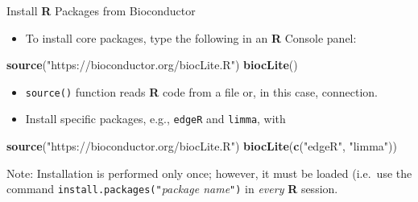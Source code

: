 \documentclass[ignorenonframetext,]{beamer}
\newenvironment{Shaded}{\begin{snugshade}}{\end{snugshade}}
\newcommand{\KeywordTok}[1]{\textcolor[rgb]{0.13,0.29,0.53}{\textbf{#1}}}
\newcommand{\StringTok}[1]{\textcolor[rgb]{0.31,0.60,0.02}{#1}}
\newcommand{\NormalTok}[1]{#1}
\providecommand{\tightlist}{%
  \setlength{\itemsep}{0pt}\setlength{\parskip}{0pt}}
\let\oldShaded\Shaded
\let\endoldShaded\endShaded
\renewenvironment{Shaded}{\footnotesize\oldShaded}{\endoldShaded}
\begin{document}
\begin{frame}[fragile]{Install \textbf{R} Packages from Bioconductor}

\begin{itemize}
\tightlist
\item
  To install core packages, type the following in an \textbf{R} Console
  panel:
\end{itemize}

\begin{Shaded}
\begin{Highlighting}[]
\KeywordTok{source}\NormalTok{(}\StringTok{"https://bioconductor.org/biocLite.R"}\NormalTok{)}
\KeywordTok{biocLite}\NormalTok{()}
\end{Highlighting}
\end{Shaded}

\vspace{-15pt}

\begin{itemize}
\item
  \texttt{source()} function reads \textbf{R} code from a file or, in
  this case, connection.
\item
  Install specific packages, e.g., \texttt{edgeR} and \texttt{limma},
  with
\end{itemize}

\begin{Shaded}
\begin{Highlighting}[]
\KeywordTok{source}\NormalTok{(}\StringTok{"https://bioconductor.org/biocLite.R"}\NormalTok{)}
\KeywordTok{biocLite}\NormalTok{(}\KeywordTok{c}\NormalTok{(}\StringTok{"edgeR"}\NormalTok{, }\StringTok{"limma"}\NormalTok{))}
\end{Highlighting}
\end{Shaded}

Note: Installation is performed only once; however, it must be loaded
(i.e.~use the command \texttt{install.packages("}\emph{package
name}\texttt{")} in \emph{every} \textbf{R} session.

\end{frame}
\end{document}
